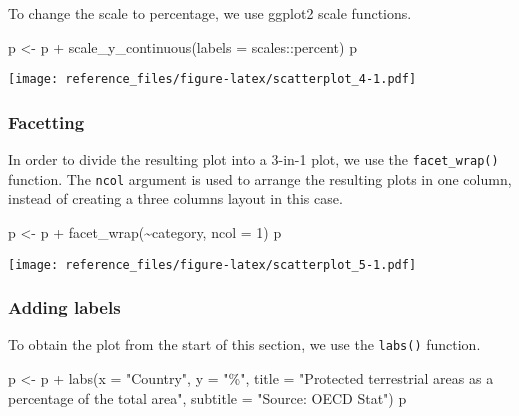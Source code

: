 \documentclass[
]{article}
\newenvironment{Shaded}{\begin{snugshade}}{\end{snugshade}}
\newcommand{\AttributeTok}[1]{\textcolor[rgb]{0.77,0.63,0.00}{#1}}
\newcommand{\DecValTok}[1]{\textcolor[rgb]{0.00,0.00,0.81}{#1}}
\newcommand{\FunctionTok}[1]{\textcolor[rgb]{0.00,0.00,0.00}{#1}}
\newcommand{\NormalTok}[1]{#1}
\newcommand{\OtherTok}[1]{\textcolor[rgb]{0.56,0.35,0.01}{#1}}
\newcommand{\SpecialCharTok}[1]{\textcolor[rgb]{0.00,0.00,0.00}{#1}}
\newcommand{\StringTok}[1]{\textcolor[rgb]{0.31,0.60,0.02}{#1}}
\begin{document}
To change the scale to percentage, we use ggplot2 scale functions.

\begin{Shaded}
\begin{Highlighting}[]
\NormalTok{p }\OtherTok{\textless{}{-}}\NormalTok{ p }\SpecialCharTok{+}
  \FunctionTok{scale\_y\_continuous}\NormalTok{(}\AttributeTok{labels =}\NormalTok{ scales}\SpecialCharTok{::}\NormalTok{percent)}
\NormalTok{p}
\end{Highlighting}
\end{Shaded}

\texttt{[image: reference\_files/figure-latex/scatterplot\_4-1.pdf]}

\hypertarget{facetting-1}{%
\subsubsection{Facetting}\label{facetting-1}}

In order to divide the resulting plot into a 3-in-1 plot, we use the
\texttt{facet\_wrap()} function. The \texttt{ncol} argument is used to
arrange the resulting plots in one column, instead of creating a three
columns layout in this case.

\begin{Shaded}
\begin{Highlighting}[]
\NormalTok{p }\OtherTok{\textless{}{-}}\NormalTok{ p }\SpecialCharTok{+}
  \FunctionTok{facet\_wrap}\NormalTok{(}\SpecialCharTok{\textasciitilde{}}\NormalTok{category, }\AttributeTok{ncol =} \DecValTok{1}\NormalTok{)}
\NormalTok{p}
\end{Highlighting}
\end{Shaded}

\texttt{[image: reference\_files/figure-latex/scatterplot\_5-1.pdf]}

\hypertarget{adding-labels-1}{%
\subsubsection{Adding labels}\label{adding-labels-1}}

To obtain the plot from the start of this section, we use the
\texttt{labs()} function.

\begin{Shaded}
\begin{Highlighting}[]
\NormalTok{p }\OtherTok{\textless{}{-}}\NormalTok{ p }\SpecialCharTok{+}
  \FunctionTok{labs}\NormalTok{(}\AttributeTok{x =} \StringTok{"Country"}\NormalTok{, }\AttributeTok{y =} \StringTok{"\%"}\NormalTok{,}
       \AttributeTok{title =} \StringTok{"Protected terrestrial areas as a percentage of the total area"}\NormalTok{,}
       \AttributeTok{subtitle =} \StringTok{"Source: OECD Stat"}\NormalTok{)}
\NormalTok{p}
\end{Highlighting}
\end{Shaded}
\end{document}

